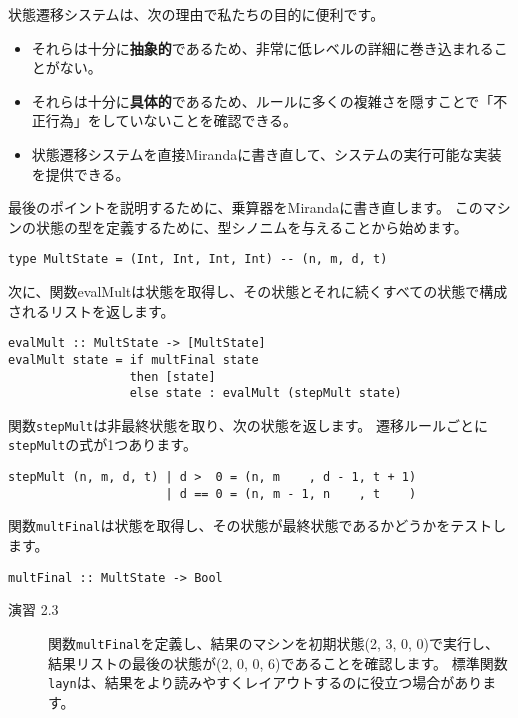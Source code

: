 \documentclass{jarticle}
\begin{document}
状態遷移システムは、次の理由で私たちの目的に便利です。

\begin{itemize}
	\item それらは十分に\textbf{抽象的}であるため、非常に低レベルの詳細に巻き込まれることがない。
	\item それらは十分に\textbf{具体的}であるため、ルールに多くの複雑さを隠すことで「不正行為」をしていないことを確認できる。
	\item 状態遷移システムを直接Mirandaに書き直して、システムの実行可能な実装を提供できる。
\end{itemize}

最後のポイントを説明するために、乗算器をMirandaに書き直します。
このマシンの状態の型を定義するために、型シノニムを与えることから始めます。

\begin{verbatim}
type MultState = (Int, Int, Int, Int) -- (n, m, d, t)
\end{verbatim}

次に、関数evalMultは状態を取得し、その状態とそれに続くすべての状態で構成されるリストを返します。

\begin{verbatim}
evalMult :: MultState -> [MultState]
evalMult state = if multFinal state
                 then [state]
                 else state : evalMult (stepMult state)
\end{verbatim}

関数\texttt{stepMult}は非最終状態を取り、次の状態を返します。
遷移ルールごとに\texttt{stepMult}の式が1つあります。

\begin{verbatim}
stepMult (n, m, d, t) | d >  0 = (n, m    , d - 1, t + 1)
                      | d == 0 = (n, m - 1, n    , t    )
\end{verbatim}

関数\texttt{multFinal}は状態を取得し、その状態が最終状態であるかどうかをテストします。

\begin{verbatim}
multFinal :: MultState -> Bool
\end{verbatim}

\begin{description}
	\item[演習 2.3] 関数\texttt{multFinal}を定義し、結果のマシンを初期状態(2, 3, 0, 0)で実行し、結果リストの最後の状態が(2, 0, 0, 6)であることを確認します。
		標準関数\texttt{layn}は、結果をより読みやすくレイアウトするのに役立つ場合があります。
\end{description}
\end{document}
